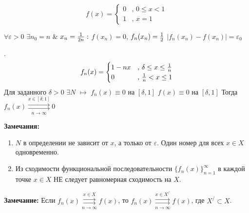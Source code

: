 \documentclass[a4paper,12pt]{article} %
\begin{document}
\begin{equation*}
f(x) = 
 \begin{cases}
   0 &\text{, $0 \leq x < {1}$}\\
   1 &\text{, $x=1$}
 \end{cases}
\end{equation*}



$\forall \varepsilon > 0$  $\exists n_0 = n$ $\&$ $x_n = {1\over 2n}:$ \newline
\hspace*{40 mm}$f(x_n) = 0$, $f_n(x_n) = {1\over2}$ \newline
\hspace*{40 mm}$|f_n(x_n) - f(x_n)| = \varepsilon_0$

.
\begin{equation*}
f_n(x) = 
 \begin{cases}
   1-nx &\text{, $\delta \leq x \leq {1 \over n}$}\\
   0 &\text{, ${1\over n}< x\leq 1$}
 \end{cases}
\end{equation*}
Для заданного $\delta > 0$ $\exists N$ $\longmapsto$ \newline
\hspace*{40 mm} $f_n(x) \equiv 0$ на $[\delta, 1]$ \newline
\hspace*{40 mm} $f(x) \equiv 0$ на $[\delta, 1]$ \newline
Тогда $f_n(x) \overset{x \in [\delta;1]}{\underset{n \rightarrow \infty}{\rightrightarrows}} 0$



\noindent \textbf{Замечания:}\newline

\begin{enumerate}
    \item $N$ в определении не зависит от $x$, а только от $\varepsilon$. Один номер для всех $x \in X$ одновременно.
    
    \item Из сходимости функциональной последовательности $\{f_n(x)\}_{n=1}^\infty$ в каждой точке $x \in X$ НЕ следует равномерная сходимость на $X$.
   
\end{enumerate}

\noindent \textbf{Замечание:} Если $f_n(x) \overset{x \in X}{\underset{n \rightarrow \infty}{\rightrightarrows}} f(x)$, то 
$f_n(x) \overset{x \in X^/}{\underset{n \rightarrow \infty}{\rightrightarrows}} f(x)$, где $X^/ \subset X$.
\end{document}
